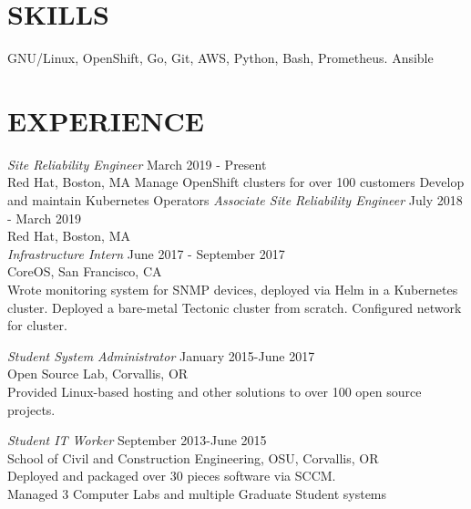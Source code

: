 \documentclass[line,margin]{res}
\begin{document}
\address{fahlmantaylor@gmail.com}
\address{github.com/fahlmant, linkedin.com/in/taylorfahlman}
\begin{resume}

                    
\section{SKILLS}
                    GNU/Linux, OpenShift, Go, Git, AWS, Python, Bash, Prometheus. Ansible
                    
\section{EXPERIENCE}
                    {\sl Site Reliability Engineer} \hfill March 2019 - Present\\
                    Red Hat,
                    Boston, MA
                    Manage OpenShift clusters for over 100 customers
                    Develop and maintain Kubernetes Operators
                    {\sl Associate Site Reliability Engineer} \hfill July 2018 - March 2019\\
                    Red Hat,
                    Boston, MA\\

                    {\sl Infrastructure Intern} \hfill June 2017 - September 2017\\
                    CoreOS,
                    San Francisco, CA\\
                    Wrote monitoring system for SNMP devices, deployed via Helm in a Kubernetes cluster.
                    Deployed a bare-metal Tectonic cluster from scratch. Configured network for cluster.

                    {\sl Student System Administrator} \hfill January 2015-June 2017\\
                    Open Source Lab, 
                    Corvallis, OR\\
                    Provided Linux-based hosting and other solutions to over 100 open source projects.

                    {\sl Student IT Worker} \hfill September 2013-June 2015 \\
                    School of Civil and Construction Engineering, OSU, 
                    Corvallis, OR\\ 
                    Deployed and packaged over 30 pieces software via SCCM.\\
                    Managed 3 Computer Labs and multiple Graduate Student systems


\end{resume}
\end{document}
